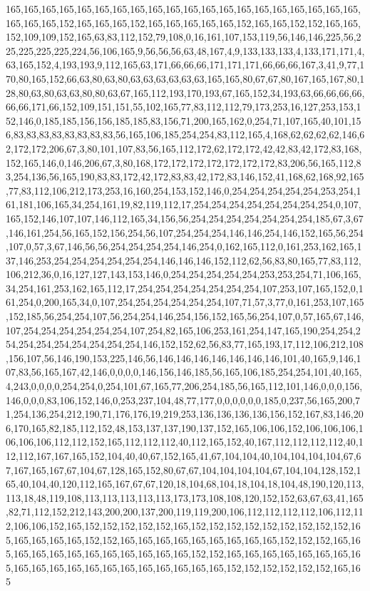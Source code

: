 165,165,165,165,165,165,165,165,165,165,165,165,165,165,165,165,165,165,165,165,165,165,165,152,165,165,165,152,165,165,165,165,165,152,165,165,152,152,165,165,152,109,109,152,165,63,83,112,152,79,108,0,16,161,107,153,119,56,146,146,225,56,225,225,225,225,224,56,106,165,9,56,56,56,63,48,167,4,9,133,133,133,4,133,171,171,4,63,165,152,4,193,193,9,112,165,63,171,66,66,66,171,171,171,66,66,66,167,3,41,9,77,170,80,165,152,66,63,80,63,80,63,63,63,63,63,63,165,165,80,67,67,80,167,165,167,80,128,80,63,80,63,63,80,80,63,67,165,112,193,170,193,67,165,152,34,193,63,66,66,66,66,66,66,171,66,152,109,151,151,55,102,165,77,83,112,112,79,173,253,16,127,253,153,152,146,0,185,185,156,156,185,185,83,156,71,200,165,162,0,254,71,107,165,40,101,156,83,83,83,83,83,83,83,83,56,165,106,185,254,254,83,112,165,4,168,62,62,62,62,146,62,172,172,206,67,3,80,101,107,83,56,165,112,172,62,172,172,42,42,83,42,172,83,168,152,165,146,0,146,206,67,3,80,168,172,172,172,172,172,172,172,83,206,56,165,112,83,254,136,56,165,190,83,83,172,42,172,83,83,42,172,83,146,152,41,168,62,168,92,165,77,83,112,106,212,173,253,16,160,254,153,152,146,0,254,254,254,254,254,253,254,161,181,106,165,34,254,161,19,82,119,112,17,254,254,254,254,254,254,254,254,0,107,165,152,146,107,107,146,112,165,34,156,56,254,254,254,254,254,254,254,185,67,3,67,146,161,254,56,165,152,156,254,56,107,254,254,254,146,146,254,146,152,165,56,254,107,0,57,3,67,146,56,56,254,254,254,254,146,254,0,162,165,112,0,161,253,162,165,137,146,253,254,254,254,254,254,254,146,146,146,152,112,62,56,83,80,165,77,83,112,106,212,36,0,16,127,127,143,153,146,0,254,254,254,254,254,253,253,254,71,106,165,34,254,161,253,162,165,112,17,254,254,254,254,254,254,254,107,253,107,165,152,0,161,254,0,200,165,34,0,107,254,254,254,254,254,254,107,71,57,3,77,0,161,253,107,165,152,185,56,254,254,107,56,254,254,146,254,156,152,165,56,254,107,0,57,165,67,146,107,254,254,254,254,254,254,107,254,82,165,106,253,161,254,147,165,190,254,254,254,254,254,254,254,254,254,254,146,152,152,62,56,83,77,165,193,17,112,106,212,108,156,107,56,146,190,153,225,146,56,146,146,146,146,146,146,146,101,40,165,9,146,107,83,56,165,167,42,146,0,0,0,0,146,156,146,185,56,165,106,185,254,254,101,40,165,4,243,0,0,0,0,254,254,0,254,101,67,165,77,206,254,185,56,165,112,101,146,0,0,0,156,146,0,0,0,83,106,152,146,0,253,237,104,48,77,177,0,0,0,0,0,0,185,0,237,56,165,200,71,254,136,254,212,190,71,176,176,19,219,253,136,136,136,136,156,152,167,83,146,206,170,165,82,185,112,152,48,153,137,137,190,137,152,165,106,106,152,106,106,106,106,106,106,112,112,152,165,112,112,112,40,112,165,152,40,167,112,112,112,112,40,112,112,167,167,165,152,104,40,40,67,152,165,41,67,104,104,40,104,104,104,104,67,67,167,165,167,67,104,67,128,165,152,80,67,67,104,104,104,104,67,104,104,128,152,165,40,104,40,120,112,165,167,67,67,120,18,104,68,104,18,104,18,104,48,190,120,113,113,18,48,119,108,113,113,113,113,113,173,173,108,108,120,152,152,63,67,63,41,165,82,71,112,152,212,143,200,200,137,200,119,119,200,106,112,112,112,112,106,112,112,106,106,152,165,152,152,152,152,152,165,152,152,152,152,152,152,152,152,152,165,165,165,165,165,152,152,165,165,165,165,165,165,165,165,165,152,152,152,165,165,165,165,165,165,165,165,165,165,165,165,152,152,165,165,165,165,165,165,165,165,165,165,165,165,165,165,165,165,165,165,165,165,152,152,152,152,152,152,165,165